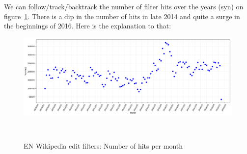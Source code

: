 
We can follow/track/backtrack the number of filter hits over the years (syn) on figure~\ref{fig:filter-hits}.
There is a dip in the number of hits in late 2014 and quite a surge in the beginnings of 2016.
Here is the explanation to that:

\begin{figure}
\centering
  \includegraphics[width=0.9\columnwidth]{pics/filter-hits-zoomed.png}
  \caption{EN Wikipedia edit filters: Number of hits per month}~\label{fig:filter-hits}
\end{figure}


